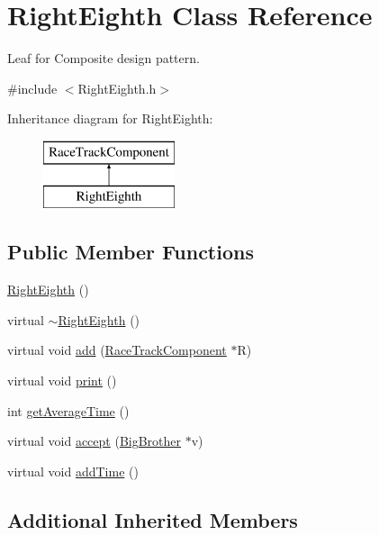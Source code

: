 \hypertarget{class_right_eighth}{}\section{Right\+Eighth Class Reference}
\label{class_right_eighth}


Leaf for Composite design pattern.  




{\ttfamily \#include $<$Right\+Eighth.\+h$>$}

Inheritance diagram for Right\+Eighth\+:\begin{figure}[H]
\begin{center}
\leavevmode
\includegraphics[height=2.000000cm]{class_right_eighth}
\end{center}
\end{figure}
\subsection*{Public Member Functions}
\begin{DoxyCompactItemize}
\item 
\mbox{\hyperlink{class_right_eighth_add9aa8a804f6e7f418028722b742381b}{Right\+Eighth}} ()
\item 
virtual \mbox{\hyperlink{class_right_eighth_a91f2bfcc307de2c48ab18ed1809226ff}{$\sim$\+Right\+Eighth}} ()
\item 
virtual void \mbox{\hyperlink{class_right_eighth_a9ca383bb10f9029d8ed0eb43cfa9edc7}{add}} (\mbox{\hyperlink{class_race_track_component}{Race\+Track\+Component}} $\ast$R)
\item 
virtual void \mbox{\hyperlink{class_right_eighth_a2d35c272dce18f3f6e9e297605877794}{print}} ()
\item 
int \mbox{\hyperlink{class_right_eighth_aca7a2c78f66db5c710e68f6a6236f992}{get\+Average\+Time}} ()
\item 
virtual void \mbox{\hyperlink{class_right_eighth_af66185d944d6c5b9854af5a95a826e5e}{accept}} (\mbox{\hyperlink{class_big_brother}{Big\+Brother}} $\ast$v)
\item 
virtual void \mbox{\hyperlink{class_right_eighth_adbe57086dd69560284c4df28fcd29221}{add\+Time}} ()
\end{DoxyCompactItemize}
\subsection*{Additional Inherited Members}


